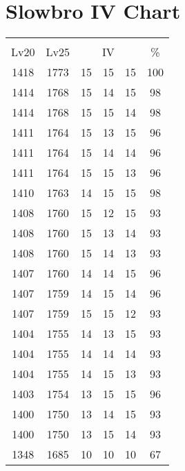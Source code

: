 \documentclass{article}%
\begin{document}
%
\normalsize%
\section{Slowbro IV Chart}%
\label{sec:Slowbro IV Chart}%
\renewcommand{\arraystretch}{1.5}%
\begin{tabular}{|c|c|c|c|c|c|}%
\hline%
\multicolumn{6}{|c|}{\textcolor{white}{ 
\linebreak{Slowbro}
}%
\cellcolor{black}}\\%
\multicolumn{1}{|c}{Lv20}&\multicolumn{1}{c|}{Lv25}&\multicolumn{3}{c|}{IV}&\multicolumn{1}{|c|}{\%}\\%
\hline%
\rowcolor{color100}%
1418&1773&15&15&15&100\\%
\hline%
\rowcolor{color98}%
1414&1768&15&14&15&98\\%
\hline%
\rowcolor{color98}%
1414&1768&15&15&14&98\\%
\hline%
\rowcolor{color96}%
1411&1764&15&13&15&96\\%
\hline%
\rowcolor{color96}%
1411&1764&15&14&14&96\\%
\hline%
\rowcolor{color96}%
1411&1764&15&15&13&96\\%
\hline%
\rowcolor{color98}%
1410&1763&14&15&15&98\\%
\hline%
\rowcolor{color93}%
1408&1760&15&12&15&93\\%
\hline%
\rowcolor{color93}%
1408&1760&15&13&14&93\\%
\hline%
\rowcolor{color93}%
1408&1760&15&14&13&93\\%
\hline%
\rowcolor{color96}%
1407&1760&14&14&15&96\\%
\hline%
\rowcolor{color96}%
1407&1759&14&15&14&96\\%
\hline%
\rowcolor{color93}%
1407&1759&15&15&12&93\\%
\hline%
\rowcolor{color93}%
1404&1755&14&13&15&93\\%
\hline%
\rowcolor{color93}%
1404&1755&14&14&14&93\\%
\hline%
\rowcolor{color93}%
1404&1755&14&15&13&93\\%
\hline%
\rowcolor{color96}%
1403&1754&13&15&15&96\\%
\hline%
\rowcolor{color93}%
1400&1750&13&14&15&93\\%
\hline%
\rowcolor{color93}%
1400&1750&13&15&14&93\\%
\hline%
\rowcolor{color91}%
1348&1685&10&10&10&67\\%
\end{tabular}

%
\end{document}
